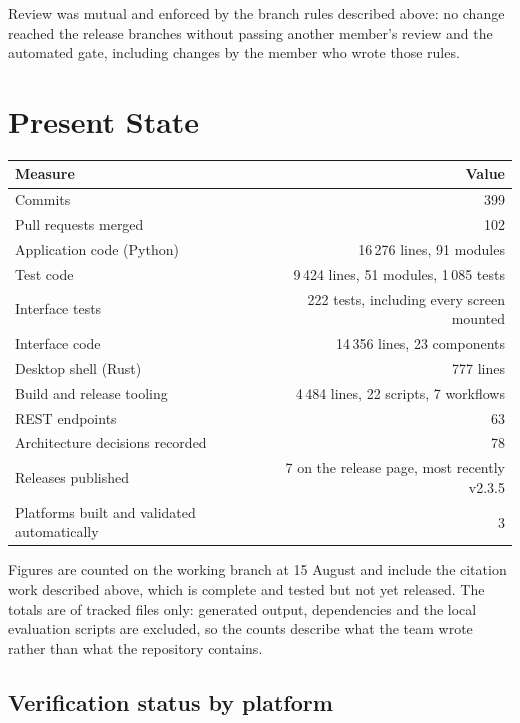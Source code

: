 \documentclass[11pt,a4paper]{article}
\begin{document}
Review was mutual and enforced by the branch rules described above: no change
reached the release branches without passing another member's review and the
automated gate, including changes by the member who wrote those rules.


\section{Present State}

\begin{center}
\small
\begin{tabular}{@{}lr@{}}
\toprule
\textbf{Measure} & \textbf{Value} \\
\midrule
Commits & 399 \\
Pull requests merged & 102 \\
Application code (Python) & 16\,276 lines, 91 modules \\
Test code & 9\,424 lines, 51 modules, 1\,085 tests \\
Interface tests & 222 tests, including every screen mounted \\
Interface code & 14\,356 lines, 23 components \\
Desktop shell (Rust) & 777 lines \\
Build and release tooling & 4\,484 lines, 22 scripts, 7 workflows \\
REST endpoints & 63 \\
Architecture decisions recorded & 78 \\
Releases published & 7 on the release page, most recently v2.3.5 \\
Platforms built and validated automatically & 3 \\
\bottomrule
\end{tabular}
\end{center}

Figures are counted on the working branch at 15 August and include the citation
work described above, which is complete and tested but not yet released. The
totals are of tracked files only: generated output, dependencies and the local
evaluation scripts are excluded, so the counts describe what the team wrote
rather than what the repository contains.

\subsection{Verification status by platform}
\end{document}
